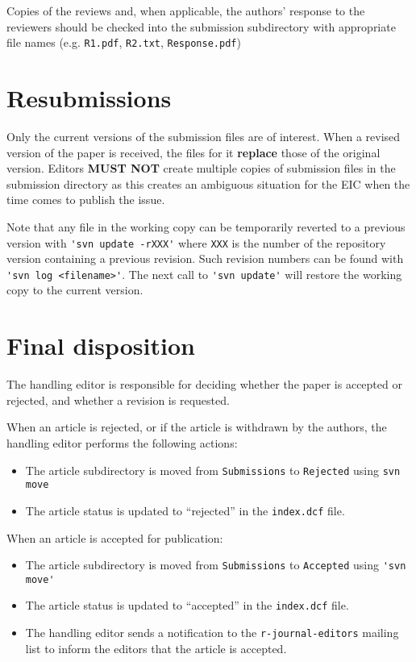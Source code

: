 \documentclass[11pt]{article}
\begin{document}
Copies of the reviews and, when applicable, the authors' response to
the reviewers should be checked into the submission subdirectory with
appropriate file names (e.g. \texttt{R1.pdf}, \texttt{R2.txt},
\texttt{Response.pdf})

\section{Resubmissions}

Only the current versions of the submission files are of interest.
When a revised version of the paper is received, the files for it {\bf
  replace} those of the original version. Editors {\bf MUST NOT}
create multiple copies of submission files in the submission directory
as this creates an ambiguous situation for the EIC when the time comes
to publish the issue.

Note that any file in the working copy can be temporarily reverted to
a previous version with \verb+'svn update -rXXX'+ where \verb+XXX+ is
the number of the repository version containing a previous revision.
Such revision numbers can be found with
\verb+'svn log <filename>'+. The next call to \verb+'svn update'+ will
restore the working copy to the current version.

\section{Final disposition}

The handling editor is responsible for deciding whether the paper is
accepted or rejected, and whether a revision is requested.

When an article is rejected, or if the article is withdrawn by the
authors, the handling editor performs the following actions:
\begin{itemize}
\item The article subdirectory is moved from \texttt{Submissions} to
  \texttt{Rejected} using \verb+svn move+
\item The article status is updated to ``rejected'' in the \texttt{index.dcf}
  file.
\end{itemize}
When an article is accepted for publication:
\begin{itemize}
\item The article subdirectory is moved from \texttt{Submissions} to
  \texttt{Accepted} using \verb+'svn move'+
\item The article status is updated to ``accepted'' in the \texttt{index.dcf}
  file.
\item The handling editor sends a notification to the \verb+r-journal-editors+
  mailing list to inform the editors that the article is accepted.
\end{itemize}
\end{document}
